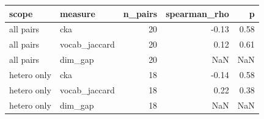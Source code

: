 \begin{tabular}{llrrr}
\toprule
scope & measure & n_pairs & spearman_rho & p \\
\midrule
all pairs & cka & 20 & -0.13 & 0.58 \\
all pairs & vocab_jaccard & 20 & 0.12 & 0.61 \\
all pairs & dim_gap & 20 & NaN & NaN \\
hetero only & cka & 18 & -0.14 & 0.58 \\
hetero only & vocab_jaccard & 18 & 0.22 & 0.38 \\
hetero only & dim_gap & 18 & NaN & NaN \\
\bottomrule
\end{tabular}

